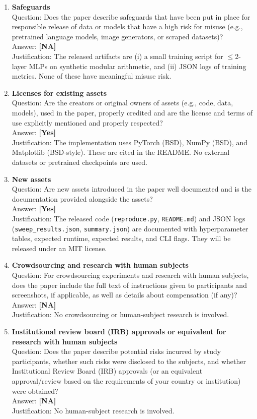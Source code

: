 \documentclass{article}
\begin{document}
\begin{enumerate}
\item {\bf Safeguards}\\
Question: Does the paper describe safeguards that have been put in place for responsible release of data or models that have a high risk for misuse (e.g., pretrained language models, image generators, or scraped datasets)?\\
Answer: \textbf{[NA]}\\
Justification: The released artifacts are (i) a small training script for $\le$2-layer MLPs on synthetic modular arithmetic, and (ii) JSON logs of training metrics. None of these have meaningful misuse risk.

\item {\bf Licenses for existing assets}\\
Question: Are the creators or original owners of assets (e.g., code, data, models), used in the paper, properly credited and are the license and terms of use explicitly mentioned and properly respected?\\
Answer: \textbf{[Yes]}\\
Justification: The implementation uses PyTorch (BSD), NumPy (BSD), and Matplotlib (BSD-style). These are cited in the README. No external datasets or pretrained checkpoints are used.

\item {\bf New assets}\\
Question: Are new assets introduced in the paper well documented and is the documentation provided alongside the assets?\\
Answer: \textbf{[Yes]}\\
Justification: The released code (\texttt{reproduce.py}, \texttt{README.md}) and JSON logs (\texttt{sweep\_results.json}, \texttt{summary.json}) are documented with hyperparameter tables, expected runtime, expected results, and CLI flags. They will be released under an MIT license.

\item {\bf Crowdsourcing and research with human subjects}\\
Question: For crowdsourcing experiments and research with human subjects, does the paper include the full text of instructions given to participants and screenshots, if applicable, as well as details about compensation (if any)?\\
Answer: \textbf{[NA]}\\
Justification: No crowdsourcing or human-subject research is involved.

\item {\bf Institutional review board (IRB) approvals or equivalent for research with human subjects}\\
Question: Does the paper describe potential risks incurred by study participants, whether such risks were disclosed to the subjects, and whether Institutional Review Board (IRB) approvals (or an equivalent approval/review based on the requirements of your country or institution) were obtained?\\
Answer: \textbf{[NA]}\\
Justification: No human-subject research is involved.


\end{enumerate}
\end{document}

